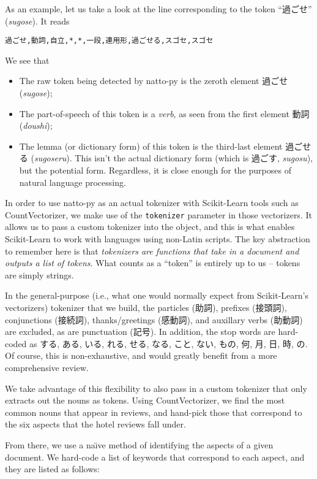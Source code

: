 \documentclass[12pt]{article}
\begin{document}
	As an example, let us take a look at the line corresponding to the token ``過ごせ'' (\textit{sugose}). It reads \begin{center}
		\verb*|過ごせ,動詞,自立,*,*,一段,連用形,過ごせる,スゴセ,スゴセ|
	\end{center}
	\newpage
	We see that \begin{itemize}
		\item The raw token being detected by natto-py is the zeroth element 過ごせ (\textit{sugose});
		\item The part-of-speech of this token is a \emph{verb}, as seen from the first element 動詞 (\textit{doushi});
		\item The lemma (or dictionary form) of this token is the third-last element 過ごせる (\textit{sugoseru}). This isn't the actual dictionary form (which is 過ごす, \textit{sugosu}), but the potential form. Regardless, it is close enough for the purposes of natural language processing.
	\end{itemize}
	
	In order to use natto-py as an actual tokenizer with Scikit-Learn tools such as CountVectorizer, we make use of the \verb*|tokenizer| parameter in those vectorizers. It allows us to pass a custom tokenizer into the object, and this is what enables Scikit-Learn to work with languages using non-Latin scripts. The key abstraction to remember here is that \emph{tokenizers are functions that take in a document and outputs a list of tokens}. What counts as a ``token'' is entirely up to us -- tokens are simply strings.
	
	In the general-purpose (i.e., what one would normally expect from Scikit-Learn's vectorizers) tokenizer that we build, the particles (助詞), prefixes (接頭詞), conjunctions (接続詞), thanks/greetings (感動詞), and auxillary verbs (助動詞) are excluded, as are punctuation (記号). In addition, the stop words are hard-coded as する, ある, いる, れる, せる, なる, こと, \mbox{ない}, \mbox{もの}, 何, 月, 日, 時, の. Of course, this is non-exhaustive, and would greatly benefit from a more comprehensive review.
	
	We take advantage of this flexibility to also pass in a custom tokenizer that only extracts out the nouns as tokens. Using CountVectorizer, we find the most common nouns that appear in reviews, and hand-pick those that correspond to the six aspects that the hotel reviews fall under.
	
	From there, we use a na\"\i ve method of identifying the aspects of a given document. We hard-code a list of keywords that correspond to each aspect, and they are listed as follows:
	
\end{document}
